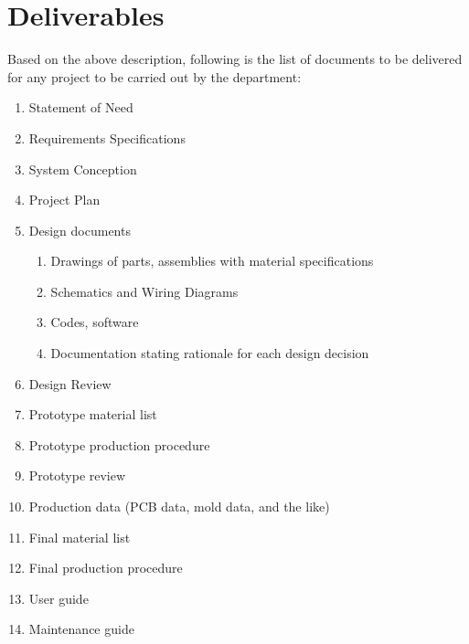 \documentclass[a4paper,10pt]{article}
\begin{document}
\section{Deliverables}

Based on the above description, following is the list of documents to be delivered for any project to be carried out by the department:
\begin{enumerate}
 \item Statement of Need
 \item Requirements Specifications
 \item System Conception
 \item Project Plan
 \item Design documents
  \begin{enumerate}
    \item Drawings of parts, assemblies with material specifications
    \item Schematics and Wiring Diagrams
    \item Codes, software
    \item Documentation stating rationale for each design decision
  \end{enumerate}
 \item Design Review
 \item Prototype material list
 \item Prototype production procedure
 \item Prototype review
 \item Production data (PCB data, mold data, and the like)
 \item Final material list
 \item Final production procedure
 \item User guide
 \item Maintenance guide
\end{enumerate}
\end{document}

